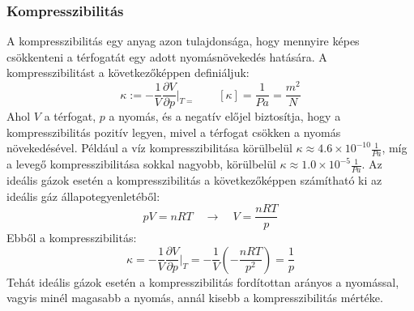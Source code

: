 \documentclass[../main.tex]{subfiles}
\begin{document}
\subsubsection*{Kompresszibilitás}
A kompresszibilitás egy anyag azon tulajdonsága, hogy mennyire képes csökkenteni a térfogatát egy adott nyomásnövekedés hatására. A kompresszibilitást a következőképpen definiáljuk:
\begin{equation}
    \kappa := -\frac{1}{V} \frac{\partial V}{\partial p}\bigg|_{T=} \quad \quad \left[\kappa\right] = \frac{1}{Pa} = \frac{m^2}{N}
\end{equation}
Ahol $V$ a térfogat, $p$ a nyomás, és a negatív előjel biztosítja, hogy a kompresszibilitás pozitív legyen, mivel a térfogat csökken a nyomás növekedésével. Például a víz kompresszibilitása körülbelül $\kappa \approx 4.6 \times 10^{-10} \frac{1}{Pa}$, míg a levegő kompresszibilitása sokkal nagyobb, körülbelül $\kappa \approx 1.0 \times 10^{-5} \frac{1}{Pa}$.
Az ideális gázok esetén a kompresszibilitás a következőképpen számítható ki az ideális gáz állapotegyenletéből:
\begin{equation}
    pV = nRT \quad \rightarrow \quad V = \frac{nRT}{p}
\end{equation}
Ebből a kompresszibilitás:
\begin{equation}
    \kappa = -\frac{1}{V} \frac{\partial V}{\partial p}\bigg|_{T} = -\frac{1}{V} \left(-\frac{nRT}{p^2}\right) = \frac{1}{p}
\end{equation}
Tehát ideális gázok esetén a kompresszibilitás fordítottan arányos a nyomással, vagyis minél magasabb a nyomás, annál kisebb a kompresszibilitás mértéke.
\end{document}

